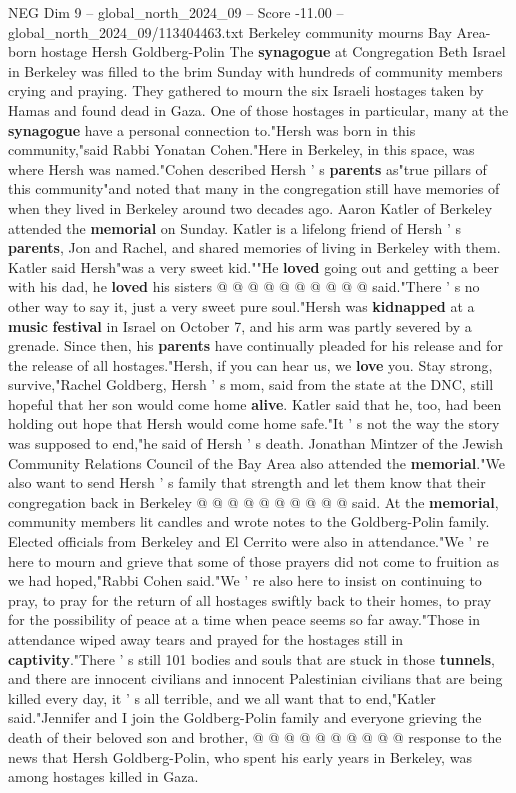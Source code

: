 \begin{textsample}{NEG Dim 9 – global\_north\_2024\_09 – Score -11.00 – global\_north\_2024\_09/113404463.txt}  \label{ex:f9_neg_009}
Berkeley community mourns Bay Area-born hostage Hersh Goldberg-Polin The \textbf{synagogue} at Congregation Beth Israel in Berkeley was filled to the brim Sunday with hundreds of community members crying and praying.
They gathered to mourn the six Israeli hostages taken by Hamas and found dead in Gaza.
One of those hostages in particular, many at the \textbf{synagogue} have a personal connection to."Hersh was born in this community,"said Rabbi Yonatan Cohen."Here in Berkeley, in this space, was where Hersh was named."Cohen described Hersh ' s \textbf{parents} as"true pillars of this community"and noted that many in the congregation still have memories of when they lived in Berkeley around two decades ago.
Aaron Katler of Berkeley attended the \textbf{memorial} on Sunday.
Katler is a lifelong friend of Hersh ' s \textbf{parents}, Jon and Rachel, and shared memories of living in Berkeley with them.
Katler said Hersh"was a very sweet kid.""He \textbf{loved} going out and getting a beer with his dad, he \textbf{loved} his sisters @ @ @ @ @ @ @ @ @ @ said."There ' s no other way to say it, just a very sweet pure soul."Hersh was \textbf{kidnapped} at a \textbf{music} \textbf{festival} in Israel on October 7, and his arm was partly severed by a grenade.
Since then, his \textbf{parents} have continually pleaded for his release and for the release of all hostages."Hersh, if you can hear us, we \textbf{love} you.
Stay strong, survive,"Rachel Goldberg, Hersh ' s mom, said from the state at the DNC, still hopeful that her son would come home \textbf{alive}.
Katler said that he, too, had been holding out hope that Hersh would come home safe."It ' s not the way the story was supposed to end,"he said of Hersh ' s death.
Jonathan Mintzer of the Jewish Community Relations Council of the Bay Area also attended the \textbf{memorial}."We also want to send Hersh ' s family that strength and let them know that their congregation back in Berkeley @ @ @ @ @ @ @ @ @ @ said.
At the \textbf{memorial}, community members lit candles and wrote notes to the Goldberg-Polin family.
Elected officials from Berkeley and El Cerrito were also in attendance."We ' re here to mourn and grieve that some of those prayers did not come to fruition as we had hoped,"Rabbi Cohen said."We ' re also here to insist on continuing to pray, to pray for the return of all hostages swiftly back to their homes, to pray for the possibility of peace at a time when peace seems so far away."Those in attendance wiped away tears and prayed for the hostages still in \textbf{captivity}."There ' s still 101 bodies and souls that are stuck in those \textbf{tunnels}, and there are innocent civilians and innocent Palestinian civilians that are being killed every day, it ' s all terrible, and we all want that to end,"Katler said."Jennifer and I join the Goldberg-Polin family and everyone grieving the death of their beloved son and brother, @ @ @ @ @ @ @ @ @ @ response to the news that Hersh Goldberg-Polin, who spent his early years in Berkeley, was among hostages killed in Gaza.

\end{textsample}
